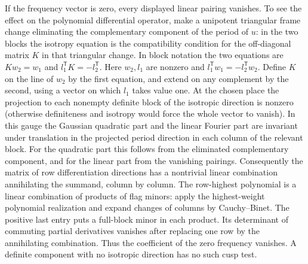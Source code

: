 If the frequency vector is zero, every displayed linear pairing
vanishes. To see the effect on the polynomial differential operator,
make a unipotent triangular frame change eliminating the complementary
component of the period of $u$: in the two blocks the isotropy
equation is the compatibility condition for the off-diagonal
matrix $K$ in that triangular change. In block notation the two
equations are $K w_2=w_1$ and $l_1^{\mathsf T}K=-l_2^{\mathsf T}$.
Here $w_2,l_1$ are nonzero and $l_1^{\mathsf T}w_1
=-l_2^{\mathsf T}w_2$. Define $K$ on the line of $w_2$ by the
first equation, and extend on any complement by the second,
using a vector on which $l_1$ takes value one. At the chosen place the projection to each
nonempty definite block of the isotropic direction is nonzero
(otherwise definiteness and isotropy would force the whole vector
to vanish). In this gauge the Gaussian quadratic part and the
linear Fourier part are invariant under translation in the
projected period direction in each column of the relevant block.
For the quadratic part this follows from the eliminated complementary
component, and for the linear part from the vanishing pairings.
Consequently the matrix of row differentiation directions has a
nontrivial linear combination annihilating the summand, column by
column. The row-highest polynomial is a linear combination of
products of flag minors: apply the highest-weight polynomial
realization and expand changes of columns by Cauchy--Binet.
The positive last entry puts a full-block minor in each product.
Its determinant of commuting partial derivatives vanishes after
replacing one row by the annihilating combination. Thus the
coefficient of the zero frequency vanishes. A definite component
with no isotropic direction has no such cusp test.

